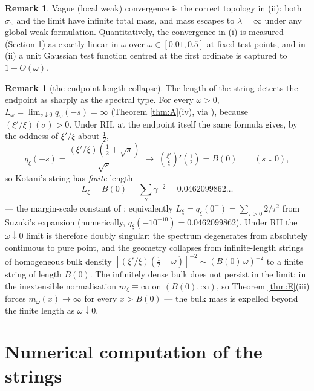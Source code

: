 \documentclass[11pt,reqno]{amsart}
\theoremstyle{plain}
\theoremstyle{definition}
\newtheorem{remark}[theorem]{Remark}
\newcommand{\lxi}[1]{\left(\tfrac{\xi'}{\xi}\right)\!#1}
\begin{document}
\begin{remark}
Vague (local weak) convergence is the correct topology in (ii): both $\sigma_\omega$ and the
limit have infinite total mass, and mass escapes to $\lambda=\infty$ under any global weak
formulation. Quantitatively, the convergence in (i) is measured (Section \ref{sec:numerics})
as exactly linear in $\omega$ over $\omega\in[0.01,0.5]$ at fixed test points, and in (ii) a
unit Gaussian test function centred at the first ordinate is captured to $1-O(\omega)$.
\end{remark}

\begin{remark}[the endpoint length collapse]\label{rem:length}
The length of the string detects the endpoint as sharply as the spectral type. For every
$\omega>0$, $L_\omega=\lim_{s\downarrow0}q_\omega(-s)=\infty$ (Theorem \ref{thm:A}(iv), via
\cite[(9)]{Kasahara}), because $(\xi'/\xi)(\sigma)>0$. Under RH, at the endpoint itself the
same formula gives, by the oddness of $\xi'/\xi$ about $\tfrac12$,
\[
  q_\xi(-s)=\frac{(\xi'/\xi)(\tfrac12+\sqrt s)}{\sqrt s}
  \;\longrightarrow\;\lxi{'\left(\tfrac12\right)}=B(0)
  \qquad(s\downarrow0),
\]
so Kotani's string has \emph{finite} length
\[
  L_\xi=B(0)=\sum_\gamma\gamma^{-2}=0.0462099862\ldots
\]
--- the margin-scale constant of \cite[Rem.~2.3]{Margin}; equivalently
$L_\xi=q_\xi(0^-)=\sum_{\tau>0}2/\tau^2$ from Suzuki's expansion \cite[\S9]{Suzuki2023}
(numerically, $q_\xi(-10^{-10})=0.0462099862$). Under RH the $\omega\downarrow0$ limit is
therefore doubly singular: the spectrum degenerates from absolutely continuous to pure point,
and the geometry collapses from infinite-length strings of homogeneous bulk density
$[(\xi'/\xi)(\tfrac12+\omega)]^{-2}\sim(B(0)\,\omega)^{-2}$ to a finite string of length
$B(0)$. The infinitely dense bulk does not persist in the limit: in the inextensible
normalisation $m_\xi\equiv\infty$ on $(B(0),\infty)$, so Theorem \ref{thm:E}(iii) forces
$m_\omega(x)\to\infty$ for every $x>B(0)$ --- the bulk mass is expelled beyond the finite
length as $\omega\downarrow0$.
\end{remark}

\section{Numerical computation of the strings}\label{sec:numerics}
\end{document}
